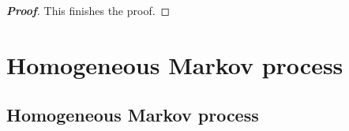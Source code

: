 \begin{proof}[\bf Proof]




This finishes the proof.
\een
\end{proof}

\section{Homogeneous Markov process}

\subsection{Homogeneous Markov process}

